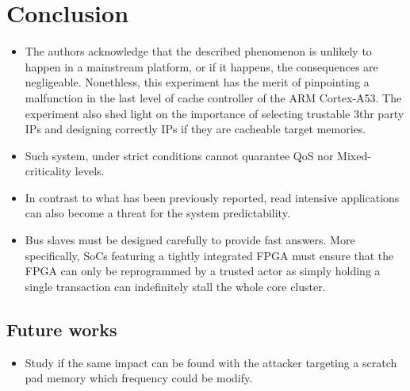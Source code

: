 \section{Conclusion}
    \begin{itemize}
        \item The authors acknowledge that the described phenomenon is unlikely to happen in a mainstream platform, or if it happens, the consequences are negligeable. Nonethless, this experiment has the merit of pinpointing a malfunction in the last level of cache controller of the ARM Cortex-A53. The experiment also shed light on the importance of selecting trustable 3thr party IPs and designing correctly IPs if they are cacheable target memories.
        \item Such system, under strict conditions cannot quarantee QoS nor Mixed-criticality levels.
        \item In contrast to what has been previously reported, read intensive applications can also become a threat for the system predictability.
        \item Bus slaves must be designed carefully to provide fast answers. More specifically, SoCs featuring a tightly integrated FPGA must ensure that the FPGA can only be reprogrammed by a trusted actor as simply holding a single transaction can indefinitely stall the whole core cluster.
    \end{itemize}

    \subsection{Future works}
        \begin{itemize}
            \item Study if the same impact can be found with the attacker targeting a scratch pad memory which frequency could be modify.
        \end{itemize}
